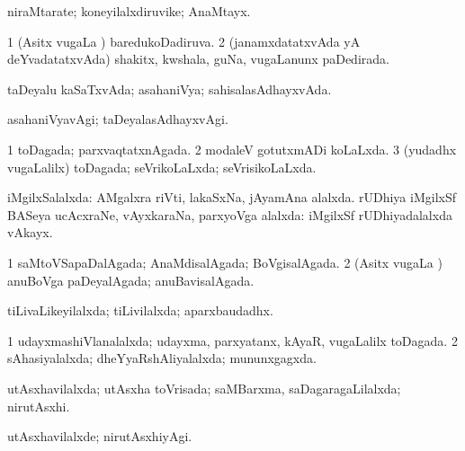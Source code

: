 \bentry
{} 
\gl{\nA}
\expl{}
\bmng
 niraMtarate; koneyilalxdiruvike; AnaMtayx. 
\emng
\eentry

\bentry
{} 
\gl{\gu}
\expl{}
\bmng
\bnum
\num{1} (Asitx \mo vugaLa \vi) baredukoDadiruva. 
\num{2} (janamxdatatxvAda yA deYvadatatxvAda) shakitx, kwshala, guNa, \mo vugaLanunx paDedirada. 
\enum
\emng
\eentry

\bentry
{} 
\gl{\gu}
\expl{}
\bmng
taDeyalu kaSaTxvAda; asahaniVya; sahisalasAdhayxvAda. 
\emng
\eentry

\bentry
{} 
\gl{\kirxvi}
\expl{}
\bmng
asahaniVyavAgi; taDeyalasAdhayxvAgi. 
\emng
\eentry

\bentry
{} 
\gl{\gu}
\expl{}
\bmng
\bnum
\num{1} toDagada; parxvaqtatxnAgada. 
\num{2} modaleV gotutxmADi koLaLxda. 
\num{3} (yudadhx \mo vugaLalilx) toDagada; seVrikoLaLxda; seVrisikoLaLxda. 
\enum
\emng
\eentry

\bentry
{} 
\gl{\gu}
\expl{}
\bmng
 iMgilxSalalxda: 
\banum
{} AMgalxra riVti, lakaSxNa, jAyamAna alalxda. 
 rUDhiya iMgilxSf BASeya ucAcxraNe, vAyxkaraNa, parxyoVga alalxda:  iMgilxSf rUDhiyadalalxda vAkayx. 
\eanum
\emng
\eentry

\bentry
{} 
\gl{\gu}
\expl{}
\bmng
\bnum
\num{1} saMtoVSapaDalAgada; AnaMdisalAgada; BoVgisalAgada. 
\num{2} (Asitx \mo vugaLa \vi) anuBoVga paDeyalAgada; anuBavisalAgada. 
\enum
\emng
\eentry

\bentry
{} 
\gl{\gu}
\expl{}
\bmng
 tiLivaLikeyilalxda; tiLivilalxda; aparxbaudadhx. 
\emng
\eentry

\bentry
{} 
\gl{\gu}
\expl{}
\bmng
\bnum
\num{1} udayxmashiVlanalalxda; udayxma, parxyatanx, kAyaR, \mo vugaLalilx toDagada. 
\num{2} sAhasiyalalxda; dheYyaRshAliyalalxda; mununxgagxda. 
\enum
\emng
\eentry

\bentry
{} 
\gl{\gu}
\expl{}
\bmng
 utAsxhavilalxda; utAsxha toVrisada; saMBarxma, saDagaragaLilalxda; nirutAsxhi. 
\emng
\eentry

\bentry
{} 
\gl{\kirxvi}
\expl{}
\bmng
utAsxhavilalxde; nirutAsxhiyAgi. 
\emng
\eentry

